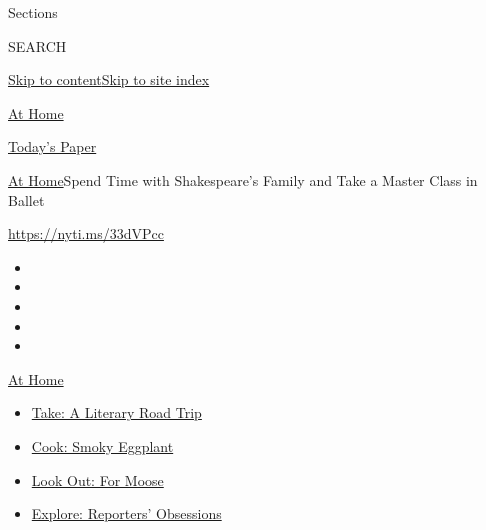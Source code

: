 Sections

SEARCH

\protect\hyperlink{site-content}{Skip to
content}\protect\hyperlink{site-index}{Skip to site index}

\href{https://www.nytimes3xbfgragh.onion/spotlight/at-home}{At Home}

\href{https://myaccount.nytimes3xbfgragh.onion/auth/login?response_type=cookie\&client_id=vi}{}

\href{https://www.nytimes3xbfgragh.onion/section/todayspaper}{Today's
Paper}

\href{/spotlight/at-home}{At Home}\textbar{}Spend Time with
Shakespeare's Family and Take a Master Class in Ballet

\url{https://nyti.ms/33dVPcc}

\begin{itemize}
\item
\item
\item
\item
\item
\end{itemize}

\href{https://www.nytimes3xbfgragh.onion/spotlight/at-home?action=click\&pgtype=Article\&state=default\&region=TOP_BANNER\&context=at_home_menu}{At
Home}

\begin{itemize}
\tightlist
\item
  \href{https://www.nytimes3xbfgragh.onion/2020/07/28/books/time-for-a-literary-road-trip.html?action=click\&pgtype=Article\&state=default\&region=TOP_BANNER\&context=at_home_menu}{Take:
  A Literary Road Trip}
\item
  \href{https://www.nytimes3xbfgragh.onion/2020/07/29/magazine/bored-with-your-home-cooking-some-smoky-eggplant-will-fix-that.html?action=click\&pgtype=Article\&state=default\&region=TOP_BANNER\&context=at_home_menu}{Cook:
  Smoky Eggplant}
\item
  \href{https://www.nytimes3xbfgragh.onion/2020/07/27/travel/moose-michigan-isle-royale.html?action=click\&pgtype=Article\&state=default\&region=TOP_BANNER\&context=at_home_menu}{Look
  Out: For Moose}
\item
  \href{https://www.nytimes3xbfgragh.onion/interactive/2020/at-home/even-more-reporters-editors-diaries-lists-recommendations.html?action=click\&pgtype=Article\&state=default\&region=TOP_BANNER\&context=at_home_menu}{Explore:
  Reporters' Obsessions}
\end{itemize}

